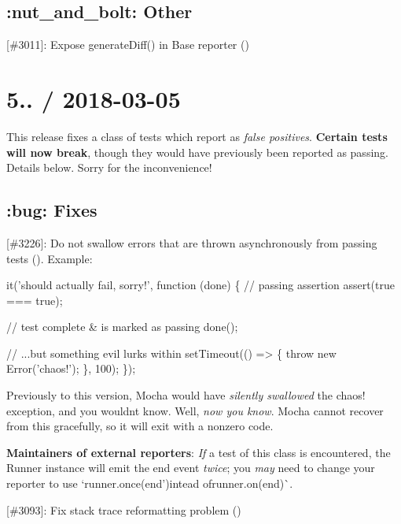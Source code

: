 \subsection*{\+:nut\+\_\+and\+\_\+bolt\+: Other}


\begin{DoxyItemize}
\item \mbox{[}\#3011\mbox{]}\+: Expose {\ttfamily generate\+Diff()} in {\ttfamily Base} reporter (\href{https://github.com/harrysarson}{\tt })
\end{DoxyItemize}

\section*{5.. / 2018-\/03-\/05}

This release fixes a class of tests which report as {\itshape false positives}. {\bfseries Certain tests will now break}, though they would have previously been reported as passing. Details below. Sorry for the inconvenience!

\subsection*{\+:bug\+: Fixes}


\begin{DoxyItemize}
\item \mbox{[}\#3226\mbox{]}\+: Do not swallow errors that are thrown asynchronously from passing tests (\href{https://github.com/boneskull}{\tt }). Example\+:
\end{DoxyItemize}


\begin{DoxyCode}
it('should actually fail, sorry!', function (done) \{
  // passing assertion
  assert(true === true);

  // test complete & is marked as passing
  done();

  // ...but something evil lurks within
  setTimeout(() => \{
    throw new Error('chaos!');
  \}, 100);
\});
\end{DoxyCode}


Previously to this version, Mocha would have {\itshape silently swallowed} the {\ttfamily chaos!} exception, and you wouldn\textquotesingle{}t know. Well, {\itshape now you know}. Mocha cannot recover from this gracefully, so it will exit with a nonzero code.

{\bfseries Maintainers of external reporters}\+: {\itshape If} a test of this class is encountered, the {\ttfamily Runner} instance will emit the {\ttfamily end} event {\itshape twice}; you {\itshape may} need to change your reporter to use `runner.\+once(\textquotesingle{}end'){\ttfamily intead of}runner.\+on(\textquotesingle{}end\textquotesingle{})\`{}.
\begin{DoxyItemize}
\item \mbox{[}\#3093\mbox{]}\+: Fix stack trace reformatting problem (\href{https://github.com/outsideris}{\tt })
\end{DoxyItemize}

